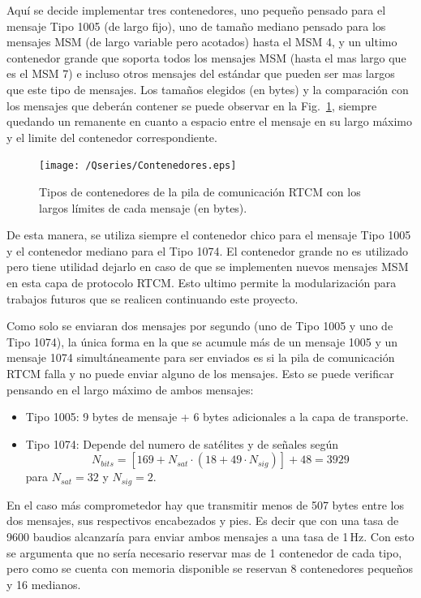 \documentclass[a4paper,12pt,oneside,onecolumn,final,openright]{book}%
\begin{document}
	 Aquí se decide implementar tres contenedores, uno pequeño pensado para el mensaje Tipo 1005 (de largo fijo), uno de tamaño mediano pensado para los mensajes MSM (de largo variable pero acotados) hasta el MSM 4, y un ultimo contenedor grande que soporta todos los mensajes MSM (hasta el mas largo que es el MSM 7) e incluso otros mensajes del estándar que pueden ser mas largos que este tipo de mensajes. Los tamaños elegidos (en bytes) y la comparación con los mensajes que deberán contener se puede observar en la Fig.~\ref{fig:contenedores}, siempre quedando un remanente en cuanto a espacio entre el mensaje en su largo máximo y el limite del contenedor correspondiente.
\begin{figure}
    \centering
	\texttt{[image: /Qseries/Contenedores.eps]}
    \caption{Tipos de contenedores de la pila de comunicación RTCM con los largos límites de cada mensaje (en bytes).}
    \label{fig:contenedores}
\end{figure}

	De esta manera, se utiliza siempre el contenedor chico para el mensaje Tipo 1005 y el contenedor mediano para el Tipo 1074. El contenedor grande no es utilizado pero tiene utilidad dejarlo en caso de que se implementen nuevos mensajes MSM en esta capa de protocolo RTCM. Esto ultimo permite la modularización para trabajos futuros que se realicen continuando este proyecto.
	
	Como solo se enviaran dos mensajes por segundo (uno de Tipo 1005 y uno de Tipo 1074), la única forma en la que se acumule más de un mensaje 1005 y un mensaje 1074 simultáneamente para ser enviados es si la pila de comunicación RTCM falla y no puede enviar alguno de los mensajes. Esto se puede verificar pensando en el largo máximo de ambos mensajes:
\begin{itemize}
	\item Tipo 1005: 9 bytes de mensaje + 6 bytes adicionales a la capa de transporte. 
	\item Tipo 1074: Depende del numero de satélites y de señales según
\begin{equation*}
	N_{bits} = \left[169 + N_{sat}\cdot(18+49\cdot N_{sig})\right] + 48 = 3929
\end{equation*}
	para $N_{sat} = 32$ y $N_{sig} = 2$. 
\end{itemize}
	En el caso más comprometedor hay que transmitir menos de 507 bytes entre los dos mensajes, sus respectivos encabezados y pies. Es decir que con una tasa de 9600 baudios alcanzaría para enviar ambos mensajes a una tasa de 1\,Hz. Con esto se argumenta que no sería necesario reservar mas de 1 contenedor de cada tipo, pero como se cuenta con memoria disponible se reservan 8 contenedores pequeños y 16 medianos.
	
\end{document}
